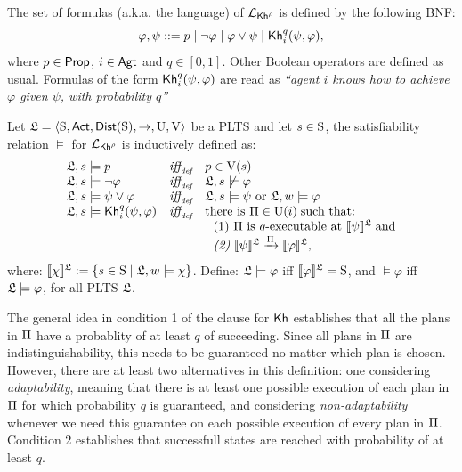 \begin{definition}
    \label{def:syntax}
    The set of formulas (a.k.a. the language) of $\PKh$ is defined by the following BNF:
    \[
        \varphi, \psi ::= p \mid \neg \varphi \mid \varphi \vee \psi \mid \kh_i^q(\psi,\varphi),
    \]
    where $p\in\PROP$, $i\in\AGT$ and $q\in[0,1]$. Other Boolean operators are defined as usual. Formulas of the form $\kh_i^q(\psi,\varphi)$ are read as \emph{``agent $i$ knows how to achieve $\varphi$ given $\psi$, with probability $q$''}
\end{definition}

\begin{definition} \label{def:semantics}
    Let $\model = \tup{\S,\ACT,\dist(\S),\ra,\Unc,\V}$ be a PLTS and let $s\in\S$, the satisfiability relation $\models$ for $\PKh$ is inductively defined as:
    \[
    \begin{array}{l@{\ \ \ }c@{\ \ \  }l}
    \model, s \models p & \iffdef & p \in \V(s) \\
    \model, s\models \neg\varphi & \iffdef & \model, s \not\models \varphi \\
    \model, s \models \psi\vee\varphi & \iffdef & \model, s \models \psi \mbox{ or }\model, w \models \varphi \\
    \model, s \models \kh_i^q(\psi,\varphi) & \iffdef & \text{there is } \plans \in \Unc(i) \;\text{such that:} \\
    & & \ \ \text{\rm (1)} \ \plans \text{ is $q$-executable at }  \truthset{\model}{\psi}\; \text{and} \\
    & & \ \ \text{\em (2)} \ \truthset{\model}{\psi} \reach{\plans} \truthset{\model}{\varphi}, 
    \end{array}
    \]     
    \noindent where: $\truthset{\model}{\chi} := \csetsc{s\in\S}{\model,w\models\chi}$. Define: $\model\models\varphi$ iff  $\truthset{\model}{\varphi}=\S$, and $\models\varphi$ iff $\model\models\varphi$, for all PLTS $\model$.
\end{definition}

The general idea in condition 1 of the clause for $\kh$ establishes that all the plans in $\plans$ have a probablity of at least $q$ of succeeding. Since all plans in $\plans$ are indistinguishability, this needs to be guaranteed no matter which plan is chosen. However, there are at least two alternatives in this definition: one considering \emph{adaptability}, meaning that there is at least one possible execution of each plan in $\plans$ for which probability $q$ is guaranteed, and considering \emph{non-adaptability} whenever we need this guarantee on each possible execution of every plan in $\plans$. Condition 2 establishes that successfull states are reached with probability of at least $q$.

